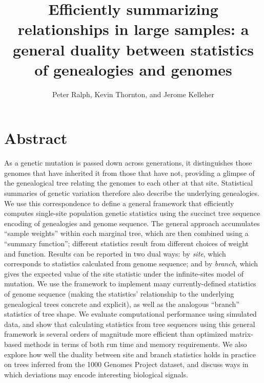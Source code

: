 \documentclass{article}
\begin{document}
\title{
    Efficiently summarizing relationships in large samples:
    a general duality between statistics of genealogies and genomes}
\author{Peter Ralph, Kevin Thornton, and Jerome Kelleher}
\maketitle



\section*{Abstract}

As a genetic mutation is passed down across generations,
it distinguishes those genomes that have inherited it from those that have not,
providing a glimpse of the genealogical tree relating the genomes to each other at that site.
Statistical summaries of genetic variation therefore also describe the underlying genealogies.
We use this correspondence to define a general framework that
efficiently computes single-site population genetic statistics
using the succinct tree sequence encoding of genealogies and genome sequence.
The general approach accumulates ``sample weights'' within each marginal tree,
which are then combined using a ``summary function'';
different statistics result from different choices of weight and function.
Results can be reported in two dual ways:
by \emph{site}, which corresponds to statistics calculated from genome
sequence; and by \emph{branch}, which gives the expected value of the site statistic
under the infinite-sites model of mutation.
We use the framework to implement many currently-defined statistics of genome
sequence (making the statistics' relationship to the underlying genealogical trees
concrete and explicit),
as well as the analogous ``branch'' statistics of tree shape. 
We evaluate computational performance using simulated data, and
show that calculating statistics from tree sequences using this general
framework is several orders of magnitude more efficient than
optimized matrix-based methods in terms of both run time and memory requirements.
We also explore how well the duality between site and branch statistics holds
in practice on trees inferred from the 1000 Genomes Project dataset,
and discuss ways in which deviations may encode interesting biological
signals.
\end{document}

